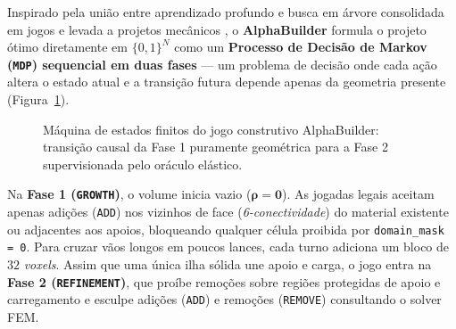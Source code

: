 \documentclass[11pt,a4paper]{article}
\begin{document}
Inspirado pela união entre aprendizado profundo e busca em árvore consolidada em jogos \citep{silver2016mastering,silver2017mastering} e levada a projetos mecânicos \citep{gaymann2019deep,luo2022alphatruss,garayalde2025mastering}, o \textbf{AlphaBuilder} formula o projeto ótimo diretamente em $\{0,1\}^N$ como um \textbf{Processo de Decisão de Markov (\texttt{MDP}) sequencial em duas fases} — um problema de decisão onde cada ação altera o estado atual e a transição futura depende apenas da geometria presente (Figura~\ref{fig:mdp-tikz}).

\begin{figure}[htbp]
\centering
{}
\caption{Máquina de estados finitos do jogo construtivo AlphaBuilder: transição causal da Fase 1 puramente geométrica para a Fase 2 supervisionada pelo oráculo elástico.}
\label{fig:mdp-tikz}
\end{figure}

Na \textbf{Fase 1 (\texttt{GROWTH})}, o volume inicia vazio ($\boldsymbol{\rho} = \mathbf{0}$). As jogadas legais aceitam apenas adições (\texttt{ADD}) nos vizinhos de face (\emph{6-conectividade}) do material existente ou adjacentes aos apoios, bloqueando qualquer célula proibida por \texttt{domain\_mask = 0}. Para cruzar vãos longos em poucos lances, cada turno adiciona um bloco de $32$ \emph{voxels}. Assim que uma única ilha sólida une apoio e carga, o jogo entra na \textbf{Fase 2 (\texttt{REFINEMENT})}, que proíbe remoções sobre regiões protegidas de apoio e carregamento e esculpe adições (\texttt{ADD}) e remoções (\texttt{REMOVE}) consultando o solver FEM.
\end{document}

